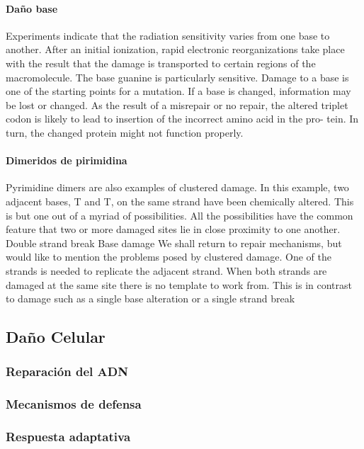 \paragraph{Daño base}
Experiments indicate that the radiation sensitivity varies from one base to another. After an initial ionization, rapid electronic reorganizations take place with the result that the damage is transported to certain regions of the macromolecule. The base guanine is particularly sensitive.
Damage to a base is one of the starting points for a mutation. If a base is changed, information may be lost or changed. As the result of a misrepair or no repair, the altered triplet codon is likely to lead to insertion of the incorrect amino acid in the pro- tein. In turn, the changed protein might not function properly.
\paragraph{Dimeridos de pirimidina}
Pyrimidine dimers are also examples of clustered damage. In this example, two adjacent bases, T and T, on the same strand have been chemically altered.
This is but one out of a
myriad of possibilities. All the possibilities have the common feature that two or more damaged sites lie in close proximity to one another.
Double strand break
Base damage
We shall return to repair mechanisms, but would like to mention the problems posed by clustered damage. One of the strands is needed to replicate the adjacent strand. When both strands are damaged at the same site there is no template to work from. This is in contrast to damage such as a single base alteration or a single strand break
\subsection{Daño Celular}
\subsubsection{Reparación del ADN}
\subsubsection{Mecanismos de defensa}
\subsubsection{Respuesta adaptativa}
